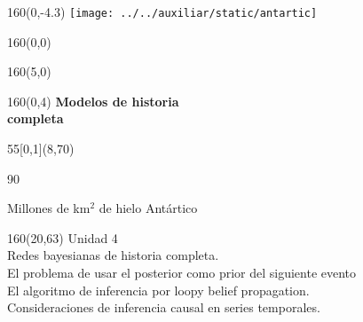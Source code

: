 \documentclass[shownotes,aspectratio=169]{beamer}
\begin{document}
\begin{frame}
\begin{textblock}{160}(0,-4.3) \centering
\texttt{[image: ../../auxiliar/static/antartic]}
\end{textblock}

\begin{textblock}{160}(0,0) \centering
{}
\end{textblock}

\begin{textblock}{160}(5,0)
\end{textblock}


\begin{textblock}{160}(0,4) \centering
\LARGE \hspace{1cm} \textcolor{black!20}{\fontsize{22}{0}\selectfont \textbf{Modelos de historia \\ \hspace{1cm} completa}}
\end{textblock}


\begin{textblock}{55}[0,1](8,70)
\begin{turn}{90}
\parbox{6cm}{\footnotesize
\textcolor{black!10}{Millones de km$^2$ de hielo Antártico}}
\end{turn}
\end{textblock}


\begin{textblock}{160}(20,63)
\textcolor{black!10}{Unidad 4 \\ \small
Redes bayesianas de historia completa. \\
El problema de usar el posterior como prior del siguiente evento\\
El algoritmo de inferencia por loopy belief propagation. \\
Consideraciones de inferencia causal en series temporales. \\
}
\end{textblock}

\end{frame}
\end{document}
